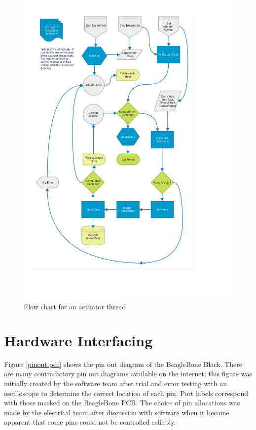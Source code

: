\begin{figure}[H]
	\centering
	\includegraphics[width=1.1\textwidth]{figures/actuator_thread.pdf}
	\caption{Flow chart for an actuator thread} 
	\label{actuator_thread.pdf}
\end{figure}


\section{Hardware Interfacing}\label{Hardware Interfacing}

Figure \ref{pinout.pdf} shows the pin out diagram of the BeagleBone Black. There are many contradictory pin out diagrams available on the internet; this figure was initially created by the software team after trial and error testing with an oscilloscope to determine the correct location of each pin. Port labels correspond with those marked on the BeagleBone PCB. The choice of pin allocations was made by the electrical team after discussion with software when it became apparent that some pins could not be controlled reliably.




